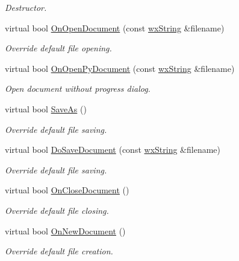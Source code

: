 \begin{DoxyCompactItemize}
\begin{DoxyCompactList}\small\item\em Destructor. \item\end{DoxyCompactList}\item 
virtual bool \hyperlink{classwxStfDoc_aa0d559931da793946eec24221ca53f1b}{OnOpenDocument} (const \hyperlink{classwxString}{wxString} \&filename)
\begin{DoxyCompactList}\small\item\em Override default file opening. \item\end{DoxyCompactList}\item 
virtual bool \hyperlink{classwxStfDoc_a02d5b6f21c9ac17f7fc6c43f7f8220d2}{OnOpenPyDocument} (const \hyperlink{classwxString}{wxString} \&filename)
\begin{DoxyCompactList}\small\item\em Open document without progress dialog. \item\end{DoxyCompactList}\item 
virtual bool \hyperlink{classwxStfDoc_a3aea82075c22916ae4ac88016b52cb19}{SaveAs} ()
\begin{DoxyCompactList}\small\item\em Override default file saving. \item\end{DoxyCompactList}\item 
virtual bool \hyperlink{classwxStfDoc_a7ad8f08b21de30f6031d16eecfb965ef}{DoSaveDocument} (const \hyperlink{classwxString}{wxString} \&filename)
\begin{DoxyCompactList}\small\item\em Override default file saving. \item\end{DoxyCompactList}\item 
virtual bool \hyperlink{classwxStfDoc_aeb6ac6149de1d6f580bde0d220810d2d}{OnCloseDocument} ()
\begin{DoxyCompactList}\small\item\em Override default file closing. \item\end{DoxyCompactList}\item 
virtual bool \hyperlink{classwxStfDoc_a1ec2a08fd79dfa8424ac0c48571ed6c9}{OnNewDocument} ()
\begin{DoxyCompactList}\small\item\em Override default file creation. \item\end{DoxyCompactList}\item 

\end{DoxyCompactItemize}
